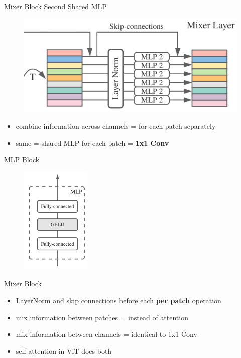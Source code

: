 \documentclass{beamer}
\begin{document}
\begin{frame}{Mixer Block Second Shared MLP}

\begin{figure}[h]
\includegraphics[width=\textwidth]{img/mlp2}
\end{figure}

\begin{itemize}
\item combine information across channels = for each patch separately
\item same = shared MLP for each patch = \textbf{1x1 Conv}
\end{itemize}

\end{frame}
\begin{frame}{MLP Block}

\begin{figure}[h]
\includegraphics[width=0.3\textwidth]{img/mlp}
\end{figure}

\end{frame}
\begin{frame}{Mixer Block}

\begin{itemize}
\item LayerNorm and skip connections before each \textbf{per patch} operation

\vfill

\item mix information between patches = instead of attention
\item mix information between channels = identical to 1x1 Conv
\item self-attention in ViT does both
\end{itemize}


\end{frame}
\end{document}

